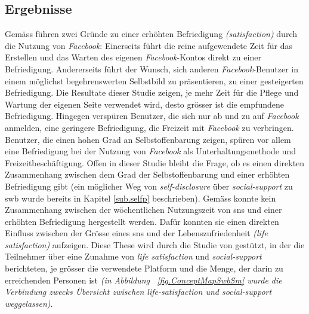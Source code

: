 \subsection{Ergebnisse}\label{subsec.amountErgebnisse}
Gemäss  führen zwei Gründe zu einer erhöhten Befriedigung \textit{(satisfaction)} durch die Nutzung von \textit{Facebook}: Einerseits führt die reine aufgewendete Zeit für das Erstellen und das Warten des eigenen \textit{Facebook}-Kontos direkt zu einer Befriedigung. Andererseits führt der Wunsch, sich anderen \textit{Facebook}-Benutzer in einem möglichst begehrenswerten Selbstbild zu präsentieren, zu einer gesteigerten Befriedigung. Die Resultate dieser  Studie zeigen, je mehr Zeit für die Pflege und Wartung der eigenen Seite verwendet wird, desto grösser ist die empfundene Befriedigung. Hingegen verspüren Benutzer, die sich nur ab und zu auf \textit{Facebook} anmelden, eine geringere Befriedigung, die Freizeit mit \textit{Facebook} zu verbringen. \newline
Benutzer, die einen hohen Grad an Selbstoffenbarung zeigen, spüren vor allem eine Befriedigung bei der Nutzung von \textit{Facebook} als Unterhaltungsmethode und Freizeitbeschäftigung. Offen in dieser Studie bleibt die Frage, ob es einen direkten Zusammenhang zwischen dem Grad der Selbstoffenbarung und einer erhöhten Befriedigung gibt (ein möglicher Weg von \textit{self-disclosure} über \textit{social-support} zu \gls{swb} wurde bereits in Kapitel \ref{sub.selfp} beschrieben).\newline
Gemäss  konnte kein Zusammenhang zwischen der wöchentlichen Nutzungszeit von \gls{sns} und einer erhöhten Befriedigung hergestellt werden. Dafür konnten sie einen direkten Einfluss zwischen der Grösse eines \gls{sns} und der Lebenszufriedenheit \textit{(life satisfaction)} aufzeigen. Diese These wird durch die Studie von  gestützt, in der die Teilnehmer über eine Zunahme von \textit{life satisfaction} und \textit{social-support} berichteten, je grösser die verwendete Platform und die Menge, der darin zu erreichenden Personen ist \textit{(in Abbildung ~\ref{fig.ConceptMapSwbSm} wurde die Verbindung zwecks Übersicht zwischen life-satisfaction und social-support weggelassen)}. 

